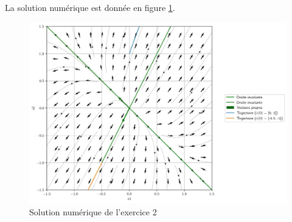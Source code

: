             La solution numérique est donnée en figure \ref{fig:pdp_exercice_2}.
            \begin{figure}[ht!]
                \centering
                \includegraphics[width=\textwidth]{images/pdp_exercice_2.jpg}
                \caption{Solution numérique de l'exercice 2}
                \label{fig:pdp_exercice_2}
            \end{figure}
        
